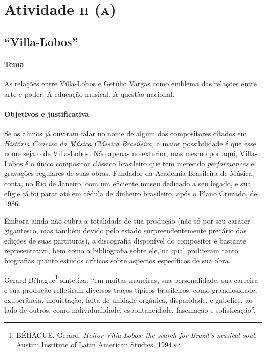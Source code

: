\documentclass[11pt]{extarticle}
\begin{document}
\section{Atividade \textsc{ii (a)}}
\subsection{``Villa-Lobos''}

\paragraph{Tema} As relações entre Villa-Lobos e Getúlio Vargas como
emblema das relações entre arte e poder. A educação musical. A questão
nacional.



\paragraph{Objetivos e justificativa}

Se os alunos já ouviram falar no nome de algum dos compositores citados
em \emph{História Concisa da Música Clássica Brasileira,} a maior
possibilidade é que esse nome seja o de Villa-Lobos\emph{.} Não apenas
no exterior, mas mesmo por aqui, Villa-Lobos é o único compositor
clássico brasileiro que tem merecido \emph{performances} e gravações
regulares de suas obras. Fundador da Academia Brasileira de Música,
conta, no Rio de Janeiro, com um eficiente museu dedicado a seu legado,
e sua efígie já foi parar até em cédula de dinheiro brasileiro, após o
Plano Cruzado, de 1986.


Embora ainda não cubra a totalidade de sua produção (não só por seu
caráter gigantesco, mas também devido pelo estado surpreendentemente
precário das edições de suas partituras), a discografia disponível do
compositor é bastante representativa, bem como a bibliografia sobre ele,
na qual proliferam tanto biografias quanto estudos críticos sobre
aspectos específicos de sua obra.

Gerard Béhague\footnote{BÉHAGUE, Gerard. \emph{Heitor Villa-Lobos: the
  search for Brazil's musical soul.} Austin: Institute of Latin American
  Studies, 1994.} sintetiza: ``em muitas maneiras, sua personalidade,
sua carreira e sua produção refletiram diversos traços típicos
brasileiros, como grandiosidade, exuberância, inquietação, falta de
unidade orgânica, disparidade, e gabolice, ao lado de outros, como
individualidade, espontaneidade, fascinação e sofisticação''.
\end{document}

